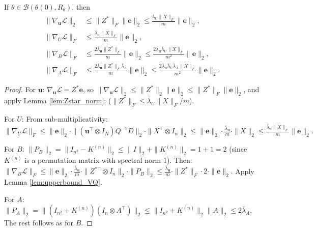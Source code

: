 \documentclass[twoside]{article}
\begin{document}
\begin{lemma}
\label{lem:grad_bounds}
If $\theta \in \mathcal{B}(\theta(0), R_\theta)$, then
\begin{align*}
\|\nabla_\mathbf{u}\mathcal{L}\|_2 
&\leq \|Z^*\|_F \|\mathbf{e}\|_2 
\leq \frac{\bar\lambda_U \|X\|_F}{m}\|\mathbf{e}\|_2, \\[4pt]
\|\nabla_U\mathcal{L}\|_F 
&\leq \frac{\bar\lambda_\mathbf{u}\|X\|_F}{m}\|\mathbf{e}\|_2, \\[4pt]
\|\nabla_B\mathcal{L}\|_F 
&\leq \frac{2\bar\lambda_\mathbf{u}\|Z^*\|_F}{m}\|\mathbf{e}\|_2
\leq \frac{2\bar\lambda_\mathbf{u}\bar\lambda_U\|X\|_F}{m^2}\|\mathbf{e}\|_2, \\[4pt]
\|\nabla_A\mathcal{L}\|_F 
&\leq \frac{2\bar\lambda_\mathbf{u}\|Z^*\|_F\bar\lambda_A}{m}\|\mathbf{e}\|_2
\leq \frac{2\bar\lambda_\mathbf{u}\bar\lambda_U\bar\lambda_A\|X\|_F}{m^2}\|\mathbf{e}\|_2.
\end{align*}
\end{lemma}

\begin{proof}
For $\mathbf{u}$: $\nabla_\mathbf{u}\mathcal{L} = Z^*\mathbf{e}$, so
$\|\nabla_\mathbf{u}\mathcal{L}\|_2 \leq \|Z^*\|_2\|\mathbf{e}\|_2 \leq \|Z^*\|_F\|\mathbf{e}\|_2$,
and apply Lemma \ref{lem:Zstar_norm}: ($\|Z^*\|_F \leq \bar\lambda_U\|X\|_F/m$).

For $U$: From sub-multiplicativity:
$\|\nabla_U\mathcal{L}\|_F \leq \|\mathbf{e}\|_2 \cdot \|(\mathbf{u}^\top \otimes I_N)Q^{-1}D\|_2 \cdot \|X^\top \otimes I_n\|_2
\leq \|\mathbf{e}\|_2 \cdot \frac{\bar\lambda_\mathbf{u}}{m} \cdot \|X\|_2
\leq \frac{\bar\lambda_\mathbf{u}\|X\|_F}{m}\|\mathbf{e}\|_2.$

For $B$: $\|P_B\|_2 = \|I_{n^2} - K^{(n)}\|_2 \leq \|I\|_2 + \|K^{(n)}\|_2 = 1 + 1 = 2$
(since $K^{(n)}$ is a permutation matrix with spectral norm 1). Then:
$\|\nabla_B\mathcal{L}\|_F \leq \|\mathbf{e}\|_2 \cdot \frac{\bar\lambda_\mathbf{u}}{m} \cdot \|Z^{*\top} \otimes I_n\|_2 \cdot \|P_B\|_2
\leq \frac{\bar\lambda_\mathbf{u}}{m} \cdot \|Z^*\|_F \cdot 2 \cdot \|\mathbf{e}\|_2.$
Apply Lemma \ref{lem:upperbound_VQ}.

For $A$: $\|P_A\|_2 = \|(I_{n^2} + K^{(n)})(I_n \otimes A^\top)\|_2 \leq \|I_{n^2} + K^{(n)}\|_2\|A\|_2 \leq 2\bar\lambda_A$.
The rest follows as for $B$. 
\end{proof}

\end{document}
